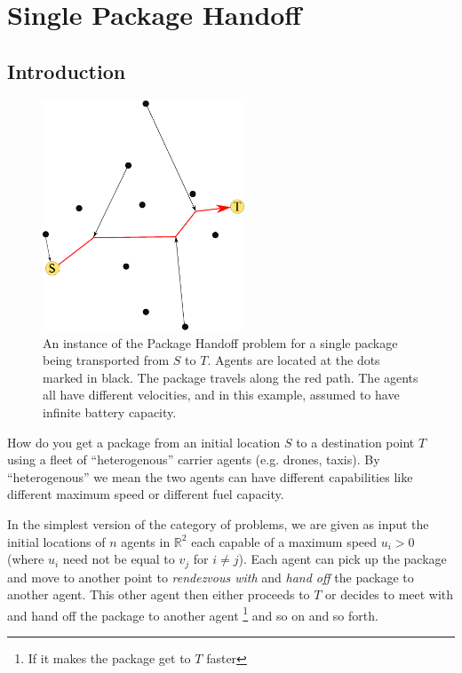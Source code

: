 \documentclass[12pt, english, oneside]{report}
\begin{document}
\newpage
\setcounter{tocdepth}{1}
\tableofcontents

\chapter{Single Package Handoff}

\section{Introduction}
\begin{figure}
  \begin{center}
    \includegraphics[width=6cm]{docs/introex.eps}
    \caption{An instance of the Package Handoff problem for a single package being transported from $S$ to $T$. 
     Agents are located at the dots marked in black. The package travels along the red path. The agents all have 
     different velocities, and in this example, assumed to have infinite battery capacity.}%
    \label{fig:introex}%
  \end{center}
\end{figure}

How do you get a package from an initial location $S$ to a destination point $T$ using a fleet of ``heterogenous'' carrier agents 
(e.g. drones, taxis). By ``heterogenous'' we mean the two agents can have different capabilities like 
different maximum speed or different fuel capacity. 


In the simplest version of the category of problems, 
we are given as input the initial locations of $n$  agents in $\mathbb{R}^2$ 
each capable of a maximum speed $u_i >0$ (where $u_i$ need not be equal to $v_j$ for $i \neq j$).
Each agent can pick up the package and move to another point to \textit{rendezvous with} and 
\textit{hand off} the 
package to another agent. This other agent then either proceeds to $T$ or decides to meet with 
and hand off the package to another agent \footnote{If it makes the package get to $T$ faster} 
and so on and so forth. 
\end{document}

